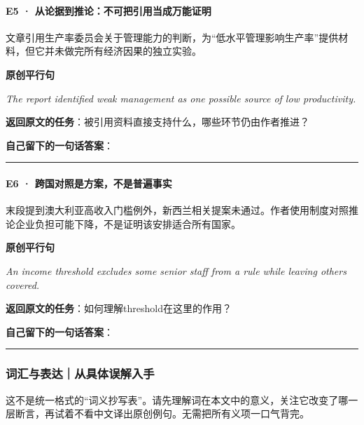 \documentclass[
  11pt,
]{ctexart}
\renewenvironment{quote}{\begin{tcolorbox}[enhanced,breakable,colback=sand,colframe=primary!22,boxrule=0.4pt,arc=2pt,left=2.6mm,right=2.6mm,top=1.6mm,bottom=1.6mm]\itshape}{\end{tcolorbox}}
\begin{document}
\paragraph{E5 ·
从论据到推论：不可把引用当成万能证明}\label{e5-ux4eceux8bbaux636eux5230ux63a8ux8bbaux4e0dux53efux628aux5f15ux7528ux5f53ux6210ux4e07ux80fdux8bc1ux660e}

文章引用生产率委员会关于管理能力的判断，为``低水平管理影响生产率''提供材料，但它并未做完所有经济因果的独立实验。

\textbf{原创平行句}

\begin{quote}
The report identified weak management as one possible source of low
productivity.
\end{quote}

\textbf{返回原文的任务}：被引用资料直接支持什么，哪些环节仍由作者推进？

\textbf{自己留下的一句话答案}：

\rule{0.75\linewidth}{0.35pt}

\paragraph{E6 ·
跨国对照是方案，不是普遍事实}\label{e6-ux8de8ux56fdux5bf9ux7167ux662fux65b9ux6848ux4e0dux662fux666eux904dux4e8bux5b9e}

末段提到澳大利亚高收入门槛例外，新西兰相关提案未通过。作者使用制度对照推论企业负担可能下降，不是证明该安排适合所有国家。

\textbf{原创平行句}

\begin{quote}
An income threshold excludes some senior staff from a rule while leaving
others covered.
\end{quote}

\textbf{返回原文的任务}：如何理解threshold在这里的作用？

\textbf{自己留下的一句话答案}：

\rule{0.75\linewidth}{0.35pt}

\subsubsection{词汇与表达｜从具体误解入手}\label{ux8bcdux6c47ux4e0eux8868ux8fbeux4eceux5177ux4f53ux8befux89e3ux5165ux624b-1}

这不是统一格式的``词义抄写表''。请先理解词在本文中的意义，关注它改变了哪一层断言，再试着不看中文译出原创例句。无需把所有义项一口气背完。
\end{document}
